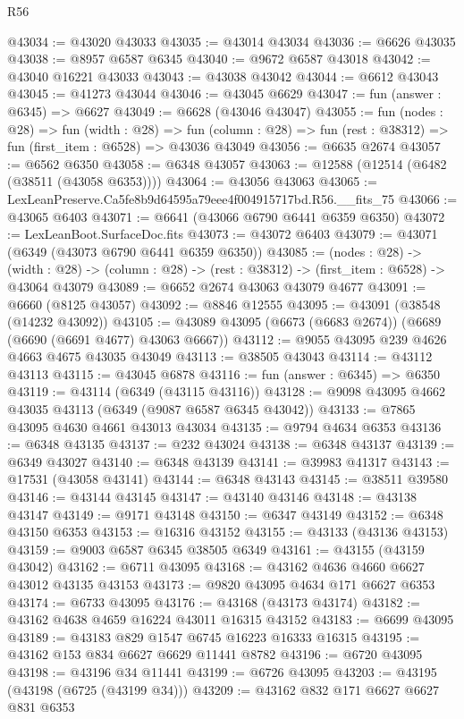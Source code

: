 \begin{lexlean}{R56}
\begin{coremodule}
@43034 := @43020 @43033
@43035 := @43014 @43034
@43036 := @6626 @43035
@43038 := @8957 @6587 @6345
@43040 := @9672 @6587 @43018
@43042 := @43040 @16221 @43033
@43043 := @43038 @43042
@43044 := @6612 @43043
@43045 := @41273 @43044
@43046 := @43045 @6629
@43047 := fun (answer : @6345) => @6627
@43049 := @6628 (@43046 @43047)
@43055 := fun (nodes : @28) =>
  fun (width : @28) =>
  fun (column : @28) => fun (rest : @38312) => fun (first_item : @6528) => @43036 @43049
@43056 := @6635 @2674
@43057 := @6562 @6350
@43058 := @6348 @43057
@43063 := @12588 (@12514 (@6482 (@38511 (@43058 @6353))))
@43064 := @43056 @43063
@43065 := LexLeanPreserve.Ca5fe8b9d64595a79eee4f004915717bd.R56.__fits_75
@43066 := @43065 @6403
@43071 := @6641 (@43066 @6790 @6441 @6359 @6350)
@43072 := LexLeanBoot.SurfaceDoc.fits
@43073 := @43072 @6403
@43079 := @43071 (@6349 (@43073 @6790 @6441 @6359 @6350))
@43085 := (nodes : @28) ->
  (width : @28) -> (column : @28) -> (rest : @38312) -> (first_item : @6528) -> @43064 @43079
@43089 := @6652 @2674 @43063 @43079 @4677
@43091 := @6660 (@8125 @43057)
@43092 := @8846 @12555
@43095 := @43091 (@38548 (@14232 @43092))
@43105 := @43089 @43095 (@6673 (@6683 @2674)) (@6689 (@6690 (@6691 @4677) @43063 @6667))
@43112 := @9055 @43095 @239 @4626 @4663 @4675 @43035 @43049
@43113 := @38505 @43043
@43114 := @43112 @43113
@43115 := @43045 @6878
@43116 := fun (answer : @6345) => @6350
@43119 := @43114 (@6349 (@43115 @43116))
@43128 := @9098 @43095 @4662 @43035 @43113 (@6349 (@9087 @6587 @6345 @43042))
@43133 := @7865 @43095 @4630 @4661 @43013 @43034
@43135 := @9794 @4634 @6353
@43136 := @6348 @43135
@43137 := @232 @43024
@43138 := @6348 @43137
@43139 := @6349 @43027
@43140 := @6348 @43139
@43141 := @39983 @41317
@43143 := @17531 (@43058 @43141)
@43144 := @6348 @43143
@43145 := @38511 @39580
@43146 := @43144 @43145
@43147 := @43140 @43146
@43148 := @43138 @43147
@43149 := @9171 @43148
@43150 := @6347 @43149
@43152 := @6348 @43150 @6353
@43153 := @16316 @43152
@43155 := @43133 (@43136 @43153)
@43159 := @9003 @6587 @6345 @38505 @6349
@43161 := @43155 (@43159 @43042)
@43162 := @6711 @43095
@43168 := @43162 @4636 @4660 @6627 @43012 @43135 @43153
@43173 := @9820 @43095 @4634 @171 @6627 @6353
@43174 := @6733 @43095
@43176 := @43168 (@43173 @43174)
@43182 := @43162 @4638 @4659 @16224 @43011 @16315 @43152
@43183 := @6699 @43095
@43189 := @43183 @829 @1547 @6745 @16223 @16333 @16315
@43195 := @43162 @153 @834 @6627 @6629 @11441 @8782
@43196 := @6720 @43095
@43198 := @43196 @34 @11441
@43199 := @6726 @43095
@43203 := @43195 (@43198 (@6725 (@43199 @34)))
@43209 := @43162 @832 @171 @6627 @6627 @831 @6353

\end{coremodule}
\end{lexlean}
